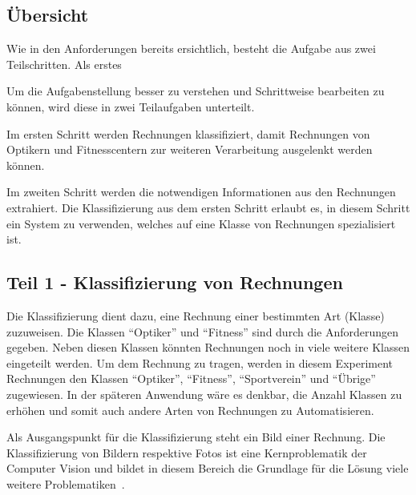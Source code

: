 
\subsection{Übersicht}

Wie in den Anforderungen bereits ersichtlich, besteht die Aufgabe aus zwei Teilschritten. Als erstes 

Um die Aufgabenstellung besser zu verstehen und Schrittweise bearbeiten zu können, wird diese in zwei Teilaufgaben unterteilt. 

Im ersten Schritt werden Rechnungen klassifiziert, damit Rechnungen von Optikern und Fitnesscentern zur weiteren Verarbeitung ausgelenkt werden können. 

Im zweiten Schritt werden die notwendigen Informationen aus den Rechnungen extrahiert. Die Klassifizierung aus dem ersten Schritt erlaubt es, in diesem Schritt ein System zu verwenden, welches auf eine Klasse von Rechnungen spezialisiert ist. 

\subsection{Teil 1 - Klassifizierung von Rechnungen}

Die Klassifizierung dient dazu, eine Rechnung einer bestimmten Art (Klasse) zuzuweisen. Die Klassen \enquote{Optiker} und \enquote{Fitness} sind durch die Anforderungen gegeben. Neben diesen Klassen könnten Rechnungen noch in viele weitere Klassen eingeteilt werden. Um dem Rechnung zu tragen, werden in diesem Experiment  Rechnungen den Klassen \enquote{Optiker}, \enquote{Fitness}, \enquote{Sportverein} und \enquote{Übrige} zugewiesen. In der späteren Anwendung wäre es denkbar, die Anzahl Klassen zu erhöhen und somit auch andere Arten von Rechnungen zu Automatisieren.

Als Ausgangspunkt für die Klassifizierung steht ein Bild einer Rechnung. Die Klassifizierung von Bildern respektive Fotos ist eine Kernproblematik der Computer Vision und bildet in diesem Bereich die Grundlage für die Lösung viele weitere Problematiken~\autocite{StanfordGithubClassification}. 

